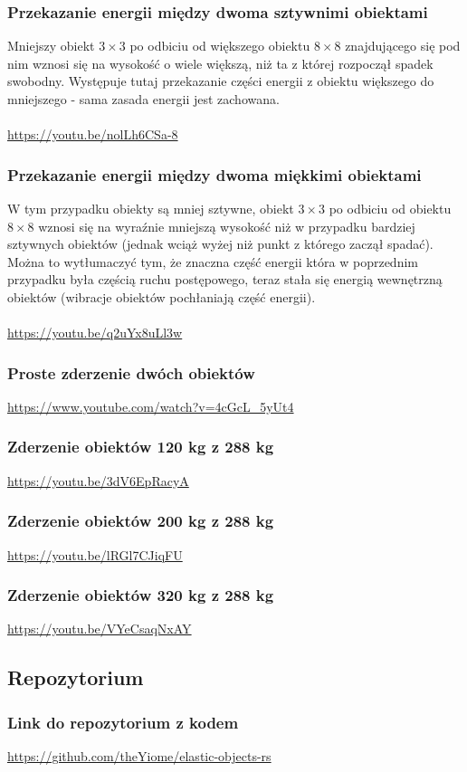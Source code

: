 \documentclass[12pt, letterpaper]{report}
\begin{document}
    \subsubsection{Przekazanie energii między dwoma sztywnimi obiektami}

    Mniejszy obiekt $3 \times 3$ po odbiciu od większego obiektu $8 \times  8$ znajdującego się 
    pod nim wznosi się na
    wysokość o wiele większą, niż ta z której rozpoczął spadek swobodny.
    Występuje tutaj przekazanie części energii z obiektu większego do mniejszego - sama zasada energii jest zachowana.
    \\
    \\
    \url{https://youtu.be/nolLh6CSa-8}

    \subsubsection{Przekazanie energii między dwoma miękkimi obiektami}
    W tym przypadku obiekty są mniej sztywne,
    obiekt $3 \times 3$ po odbiciu od obiektu $8 \times  8$ wznosi się na wyraźnie mniejszą wysokość niż w przypadku bardziej sztywnych obiektów
    (jednak wciąż wyżej niż punkt z którego zaczął spadać). Można to wytłumaczyć tym,
    że znaczna część energii która w poprzednim przypadku była częścią ruchu postępowego,
    teraz stała się energią wewnętrzną obiektów (wibracje obiektów pochłaniają część energii).
    \\
    \\
    \url{https://youtu.be/q2uYx8uLl3w}

    \subsubsection{Proste zderzenie dwóch obiektów}
    \url{https://www.youtube.com/watch?v=4cGcL_5yUt4}

    \subsubsection{Zderzenie obiektów 120 kg z 288 kg}
    \url{https://youtu.be/3dV6EpRacyA}

    \subsubsection{Zderzenie obiektów 200 kg z 288 kg}
    \url{https://youtu.be/lRGl7CJiqFU}

    \subsubsection{Zderzenie obiektów 320 kg z 288 kg}
    \url{https://youtu.be/VYeCsaqNxAY}

    \subsection{Repozytorium}
    \subsubsection{Link do repozytorium z kodem}
    \url{https://github.com/theYiome/elastic-objects-rs}
\end{document}
